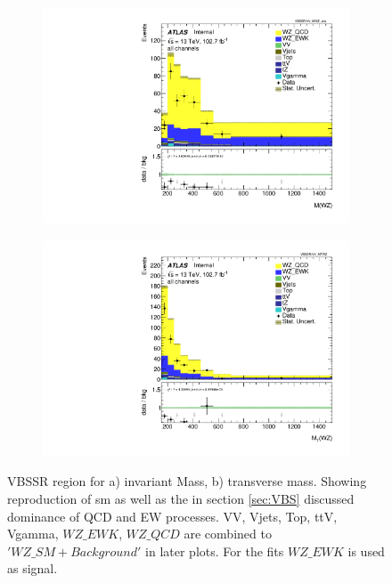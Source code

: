 \documentclass[../Bachelorarbeit.tex]{subfiles}
\begin{document}
\begin{figure}[h]
    \centering
    \begin{subfigure}{0.45\textwidth}
        \centering
        \includegraphics[width=\textwidth]{Plots/SM_reproduction/all_VV_MWZ_vbs.pdf}
        \caption{}
    \end{subfigure}
    \begin{subfigure}{0.45\textwidth}
        \centering
        \includegraphics[width=\textwidth]{Plots/SM_reproduction/all_VV_MTWZ.pdf}
        \caption{}
    \end{subfigure}
    \caption{VBSSR region for a) invariant Mass, b) transverse mass. Showing reproduction of \acrshort{sm} as well as the in section \ref{sec:VBS} discussed dominance of QCD and EW processes. VV, Vjets, Top, ttV, Vgamma, $WZ\_EWK$, $WZ\_QCD$ are combined to $'WZ\_SM + Background'$ in later plots. For the fits $WZ\_EWK$ is used as signal.}
    \label{fig:SM_re}
\end{figure}
\pagebreak
\end{document}
